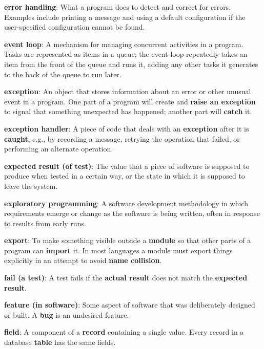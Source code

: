 \documentclass[krantzl]{krantz}
\newcommand{\glosskey}[1]{\textbf{#1}}
\begin{document}
\noindent \textbf{\glosskey{error handling}}: 
What a program does to detect and correct for errors. Examples include printing a message and using a default configuration if the user-specified configuration cannot be found.


\noindent \textbf{\glosskey{event loop}}: 
A mechanism for managing concurrent activities in a program. Tasks are represented as items in a queue; the event loop repeatedly takes an item from the front of the queue and runs it, adding any other tasks it generates to the back of the queue to run later.


\noindent \textbf{\glosskey{exception}}: 
An object that stores information about an error or other unusual event in a program. One part of a program will create and \glosskey{raise an exception} to signal that something unexpected has happened; another part will \glosskey{catch} it.


\noindent \textbf{\glosskey{exception handler}}: 
A piece of code that deals with an \glosskey{exception} after it is \glosskey{caught}, e.g., by recording a message, retrying the operation that failed, or performing an alternate operation.


\noindent \textbf{\glosskey{expected result (of test)}}: 
The value that a piece of software is supposed to produce when tested in a certain way, or the state in which it is supposed to leave the system.


\noindent \textbf{\glosskey{exploratory programming}}: 
A software development methodology in which requirements emerge or change as the software is being written, often in response to results from early runs.


\noindent \textbf{\glosskey{export}}: 
To make something visible outside a \glosskey{module} so that other parts of a program can \glosskey{import} it. In most languages a module must export things explicitly in an attempt to avoid \glosskey{name collision}.


\noindent \textbf{\glosskey{fail (a test)}}: 
A test fails if the \glosskey{actual result} does not match the \glosskey{expected result}.


\noindent \textbf{\glosskey{feature (in software)}}: 
Some aspect of software that was deliberately designed or built. A \glosskey{bug} is an undesired feature.


\noindent \textbf{\glosskey{field}}: 
A component of a \glosskey{record} containing a single value. Every record in a database \glosskey{table} has the same fields.
\end{document}
